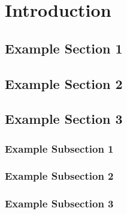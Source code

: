 \documentclass[12pt,a4paper,twoside,openany]{report}
\begin{document}
	
	
	
	
	
	
	
	


	\chapter{Introduction}


	\section{Example Section 1}
	\blindtext[2]
	\blindtext[2]
	\section{Example Section 2}
	\blindtext[5]
	\section{Example Section 3}
	\subsection{Example Subsection 1}
	\blindtext[5]
	\subsection{Example Subsection 2}
	\blindtext[5]
	\subsection{Example Subsection 3}
	\blindtext[1]
\end{document}
